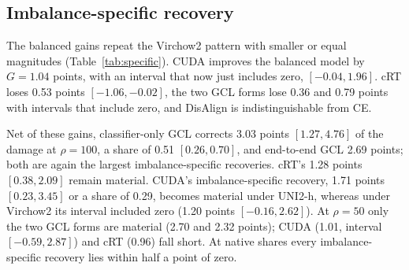 \subsection{Imbalance-specific recovery}
The balanced gains repeat the Virchow2 pattern with smaller or equal magnitudes (Table~\ref{tab:specific}). CUDA improves the balanced model by $G=1.04$ points, with an interval that now just includes zero, $[-0.04, 1.96]$. cRT loses 0.53 points $[-1.06, -0.02]$, the two GCL forms lose 0.36 and 0.79 points with intervals that include zero, and DisAlign is indistinguishable from CE.

Net of these gains, classifier-only GCL corrects 3.03 points $[1.27, 4.76]$ of the damage at $\rho=100$, a share of 0.51 $[0.26, 0.70]$, and end-to-end GCL 2.69 points; both are again the largest imbalance-specific recoveries. cRT's 1.28 points $[0.38, 2.09]$ remain material. CUDA's imbalance-specific recovery, 1.71 points $[0.23, 3.45]$ or a share of 0.29, becomes material under UNI2-h, whereas under Virchow2 its interval included zero (1.20 points $[-0.16, 2.62]$). At $\rho=50$ only the two GCL forms are material (2.70 and 2.32 points); CUDA (1.01, interval $[-0.59, 2.87]$) and cRT (0.96) fall short. At native shares every imbalance-specific recovery lies within half a point of zero.

\begin{table}[t]
\centering
\small
{}
\caption{Under UNI2-h, classifier-only GCL again corrects the largest part of the imbalance, and CUDA's imbalance-specific recovery is material at $\rho=100$. Balanced gain $G_m$ and imbalance-specific recovery $R_m-G_m$ (Eq.~\ref{eq:endpoints}) in BA points, with its share of the CE damage at $\rho=100$; paired 95\% intervals, bold marks material recovery. $^{\dagger}$Classifier only. Balanced sampling and logit adjustment have $G_m=0$ by construction.}
\label{tab:specific}
\end{table}

